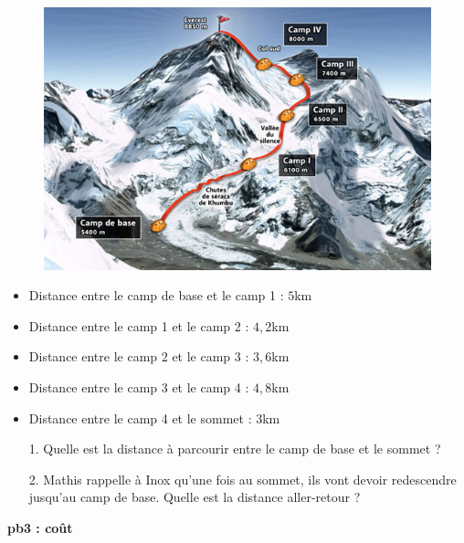 \begin{multicols}{2}

\begin{figure}[H]
  \centering
  \includegraphics[width=0.8\linewidth]{5x1-calcul-numerique/camp.jpg}
\end{figure} \columnbreak

\begin{itemize}[label={$\bullet$}]
  \item Distance entre le camp de base et le camp 1 : $5$km \\
  \item Distance entre le camp 1 et le camp 2 : $4,2$km \\
  \item Distance entre le camp 2 et le camp 3 : $3,6$km \\
  \item Distance entre le camp 3 et le camp 4 : $4,8$km \\
  \item Distance entre le camp 4 et le sommet : $3$km \\
\end{itemize} 

\end{multicols}

\begin{enumerate}
  \item[1.] Quelle est la distance à parcourir entre le camp de base et le sommet ?
  \item[2.] Mathis rappelle à Inox qu'une fois au sommet, ils vont devoir redescendre jusqu'au camp de base. Quelle est la distance aller-retour ? \\
\end{enumerate}

\textbf{pb3 : coût} \\

